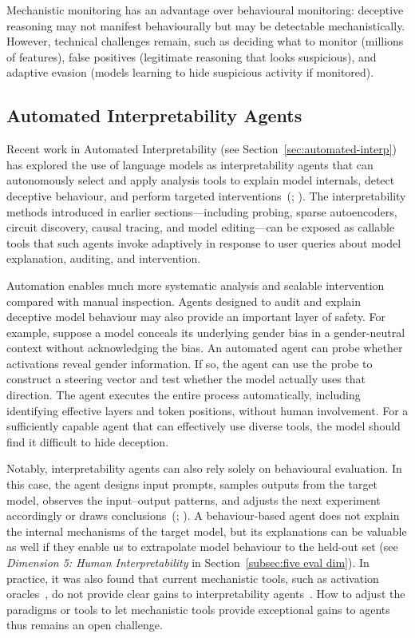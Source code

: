 Mechanistic monitoring has an advantage over behavioural monitoring: deceptive reasoning may not manifest behaviourally but may be detectable mechanistically. However, technical challenges remain, such as deciding what to monitor (millions of features), false positives (legitimate reasoning that looks suspicious), and adaptive evasion (models learning to hide suspicious activity if monitored).

\subsection{Automated Interpretability Agents}
\label{sec:automated-interpretability}


Recent work in Automated Interpretability (see Section~\ref{sec:automated-interp}) has explored the use of language models as interpretability agents that can autonomously select and apply analysis tools to explain model internals, detect deceptive behaviour, and perform targeted interventions~(; ). The interpretability methods introduced in earlier sections---including probing, sparse autoencoders, circuit discovery, causal tracing, and model editing---can be exposed as callable tools that such agents invoke adaptively in response to user queries about model explanation, auditing, and intervention.

Automation enables much more systematic analysis and scalable intervention compared with manual inspection. Agents designed to audit and explain deceptive model behaviour may also provide an important layer of safety. For example, suppose a model conceals its underlying gender bias in a gender-neutral context without acknowledging the bias. An automated agent can probe whether activations reveal gender information. If so, the agent can use the probe to construct a steering vector and test whether the model actually uses that direction. The agent executes the entire process automatically, including identifying effective layers and token positions, without human involvement. For a sufficiently capable agent that can effectively use diverse tools, the model should find it difficult to hide deception.

Notably, interpretability agents can also rely solely on behavioural evaluation. In this case, the agent designs input prompts, samples outputs from the target model, observes the input--output patterns, and adjusts the next experiment accordingly or draws conclusions~(; ). A behaviour-based agent does not explain the internal mechanisms of the target model, but its explanations can be valuable as well if they enable us to extrapolate model behaviour to the held-out set (see \emph{Dimension 5: Human Interpretability} in Section~\ref{subsec:five eval dim}). In practice, it was also found that current mechanistic tools, such as activation oracles~, do not provide clear gains to interpretability agents~. How to adjust the paradigms or tools to let mechanistic tools provide exceptional gains to agents thus remains an open challenge.

